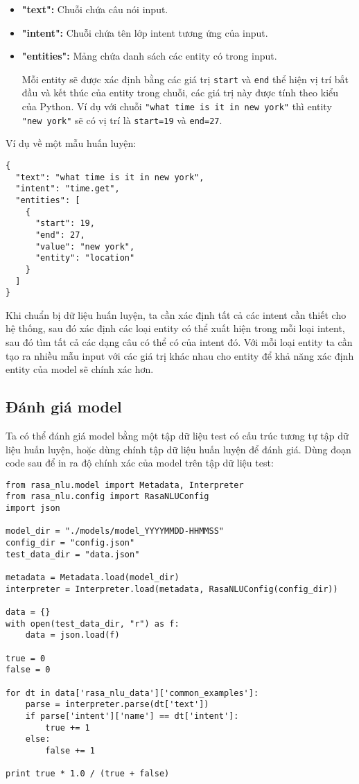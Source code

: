 \begin{itemize}
    \item \textbf{"text":} Chuỗi chứa câu nói input.
    
    \item \textbf{"intent":} Chuỗi chứa tên lớp intent tương ứng của input.
    
    \item \textbf{"entities":} Mảng chứa danh sách các entity có trong input.
    
    Mỗi entity sẽ được xác định bằng các giá trị \lstinline{start} và \lstinline{end} thể hiện vị trí bắt đầu và kết thúc của entity trong chuỗi, các giá trị này được tính theo kiểu của Python. Ví dụ với chuỗi \lstinline{"what time is it in new york"} thì entity \lstinline{"new york"} sẽ có vị trí là \lstinline{start=19} và \lstinline{end=27}.
\end{itemize}

Ví dụ về một mẫu huấn luyện:

\begin{lstlisting}
{
  "text": "what time is it in new york",
  "intent": "time.get",
  "entities": [
    {
      "start": 19,
      "end": 27,
      "value": "new york",
      "entity": "location"
    }
  ]
}
\end{lstlisting}

Khi chuẩn bị dữ liệu huấn luyện, ta cần xác định tất cả các intent cần thiết cho hệ thống, sau đó xác định các loại entity có thể xuất hiện trong mỗi loại intent, sau đó tìm tất cả các dạng câu có thể có của intent đó. Với mỗi loại entity ta cần tạo ra nhiều mẫu input với các giá trị khác nhau cho entity để khả năng xác định entity của model sẽ chính xác hơn.

\subsection{Đánh giá model}

Ta có thể đánh giá model bằng một tập dữ liệu test có cấu trúc tương tự tập dữ liệu huấn luyện, hoặc dùng chính tập dữ liệu huấn luyện để đánh giá. Dùng đoạn code sau để in ra độ chính xác của model trên tập dữ liệu test:

\begin{lstlisting}
from rasa_nlu.model import Metadata, Interpreter
from rasa_nlu.config import RasaNLUConfig
import json

model_dir = "./models/model_YYYYMMDD-HHMMSS"
config_dir = "config.json"
test_data_dir = "data.json"

metadata = Metadata.load(model_dir)
interpreter = Interpreter.load(metadata, RasaNLUConfig(config_dir))

data = {}
with open(test_data_dir, "r") as f:
    data = json.load(f)

true = 0
false = 0

for dt in data['rasa_nlu_data']['common_examples']:
    parse = interpreter.parse(dt['text'])
    if parse['intent']['name'] == dt['intent']:
        true += 1
    else:
        false += 1

print true * 1.0 / (true + false)
\end{lstlisting}

